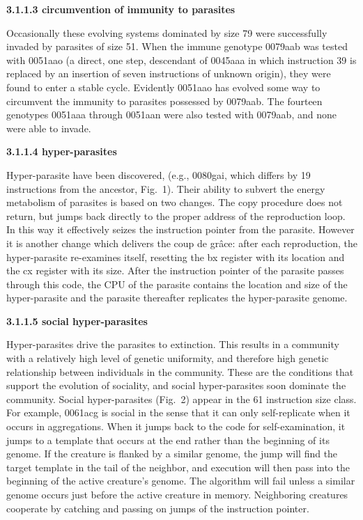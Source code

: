 \LP
\bf 3.1.1.3 circumvention of immunity to parasites\rm
\eLP

Occasionally these evolving systems dominated by size 79 were successfully
invaded by parasites of size 51.  When the immune genotype 0079aab was tested
with 0051aao (a direct, one step, descendant of 0045aaa in which instruction
39 is replaced by an insertion of seven instructions of unknown origin), they
were found to enter a stable cycle.  Evidently 0051aao has evolved some way to
circumvent the immunity to parasites possessed by 0079aab.  The fourteen
genotypes 0051aaa through 0051aan were also tested with 0079aab, and none were
able to invade.

\LP
\bf 3.1.1.4 hyper-parasites\rm
\eLP

Hyper-parasite have been discovered, (e.g., 0080gai, which differs by 19
instructions from the ancestor, Fig.\ 1).  Their ability to subvert the energy
metabolism of parasites is based on two changes.  The copy procedure does not
return, but jumps back directly to the proper address of the reproduction loop.
In this way it effectively seizes the instruction pointer from the parasite.
However it is another change which delivers the coup de gr\^{a}ce: after
each reproduction, the hyper-parasite re-examines itself, resetting the bx
register with its location and the cx register with its size.  After the
instruction pointer of the parasite passes through this code, the CPU of the
parasite contains the location and size of the hyper-parasite and the
parasite thereafter replicates the hyper-parasite genome.

\LP
\bf 3.1.1.5 social hyper-parasites\rm
\eLP

Hyper-parasites drive the parasites to extinction.  This results in a
community with a relatively high level of genetic uniformity, and therefore
high genetic relationship between individuals in the community.  These are
the conditions that support the evolution of sociality, and social
hyper-parasites soon dominate the community.  Social hyper-parasites (Fig.\ 2)
appear in the 61 instruction size class.  For example, 0061acg is social in
the sense that it can only self-replicate when it occurs in aggregations.
When it jumps back to the code for self-examination, it jumps to a template
that occurs at the end rather than the beginning of its genome.  If the
creature is flanked by a similar genome, the jump will find the target
template in the tail of the neighbor, and execution will then pass into
the beginning of the active creature's genome.  The algorithm will fail unless
a similar genome occurs just before the active creature in memory.  Neighboring
creatures cooperate by catching and passing on jumps of the instruction
pointer.

